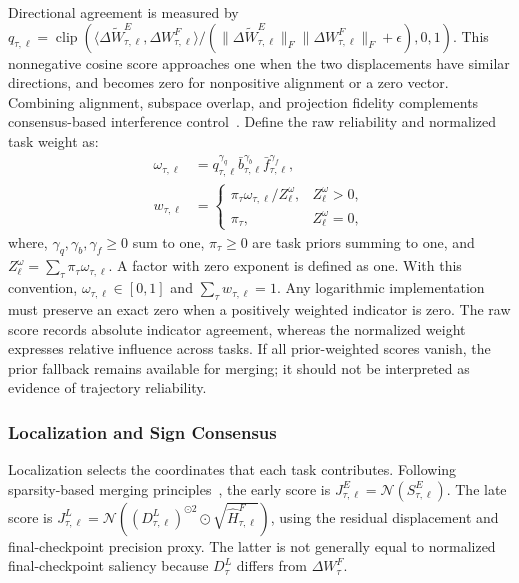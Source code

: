 \documentclass[fleqn,10pt]{wlscirep}
\begin{document}
Directional agreement is measured by $q_{\tau,\ell}=\operatorname{clip} (\langle\Delta\widetilde W_{\tau,\ell}^{E},\Delta W_{\tau,\ell}^{F}\rangle/ (\|\Delta\widetilde W_{\tau,\ell}^{E}\|_F \|\Delta W_{\tau,\ell}^{F}\|_F+\epsilon),0,1)$. This nonnegative cosine score approaches one when the two displacements have similar directions, and becomes zero for nonpositive alignment or a zero vector. Combining alignment, subspace overlap, and projection fidelity complements consensus-based interference control~\cite{wudi2025,calm2025,catmerging2025}. Define the raw reliability and normalized task weight as:
\begin{equation}
\begin{aligned}
\omega_{\tau,\ell}
&=q_{\tau,\ell}^{\gamma_q}
\bar b_{\tau,\ell}^{\gamma_b}
\bar f_{\tau,\ell}^{\gamma_f},\\
w_{\tau,\ell}
&=\begin{cases}
\pi_{\tau}\omega_{\tau,\ell}/Z_{\ell}^{\omega},
&Z_{\ell}^{\omega}>0,\\
\pi_{\tau},&Z_{\ell}^{\omega}=0,
\end{cases}
\end{aligned}
\label{eq:trajectory_reliability}
\end{equation}
where, $\gamma_q,\gamma_b,\gamma_f\geq0$ sum to one, $\pi_{\tau}\geq0$ are task priors summing to one, and $Z_{\ell}^{\omega}=\sum_{\tau}\pi_{\tau}\omega_{\tau,\ell}$. A factor with zero exponent is defined as one. With this convention, $\omega_{\tau,\ell}\in[0,1]$ and $\sum_{\tau}w_{\tau,\ell}=1$. Any logarithmic implementation must preserve an exact zero when a positively weighted indicator is zero. The raw score records absolute indicator agreement, whereas the normalized weight expresses relative influence across tasks. If all prior-weighted scores vanish, the prior fallback remains available for merging; it should not be interpreted as evidence of trajectory reliability.

\subsubsection{Localization and Sign Consensus}
\label{subsubsec:early_merge}
\label{subsubsec:early_localization}
\label{subsubsec:early_sign_consensus}
\label{subsubsec:late_merge}
\label{subsubsec:late_localization}
\label{subsubsec:late_conflict_resolution}

Localization selects the coordinates that each task contributes. Following sparsity-based merging principles~\cite{tallmasks2024,modelbreadcrumbs2024,cabs2025}, the early score is $J_{\tau,\ell}^{E}=\mathcal{N}(S_{\tau,\ell}^{E})$. The late score is $J_{\tau,\ell}^{L}=\mathcal{N}((D_{\tau,\ell}^{L})^{\odot2} \odot\sqrt{\widehat H_{\tau,\ell}^{F}})$, using the residual displacement and final-checkpoint precision proxy. The latter is not generally equal to normalized final-checkpoint saliency because $D_{\tau}^{L}$ differs from $\Delta W_{\tau}^{F}$.
\end{document}
